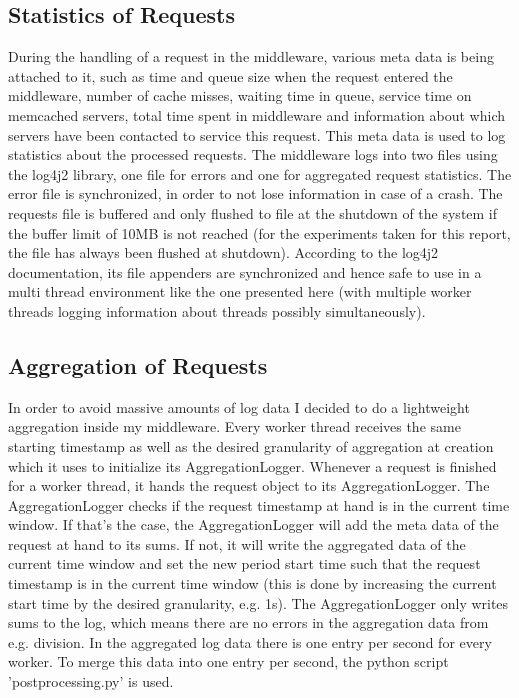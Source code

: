 \documentclass[11pt,a4paper]{article}
\begin{document}
\subsection{Statistics of Requests}
During the handling of a request in the middleware, various meta data is being attached to it, such as time and queue size when the request entered the middleware, number of cache misses, waiting time in queue, service time on memcached servers, total time spent in middleware and information about which servers have been contacted to service this request.
This meta data is used to log statistics about the processed requests.
The middleware logs into two files using the log4j2 library, one file for errors and one for aggregated request statistics.
The error file is synchronized, in order to not lose information in case of a crash.
The requests file is buffered and only flushed to file at the shutdown of the system if the buffer limit of 10MB is not reached (for the experiments taken for this report, the file has always been flushed at shutdown).
According to the log4j2 documentation, its file appenders are synchronized and hence safe to use in a multi thread environment like the one presented here (with multiple worker threads logging information about threads possibly simultaneously).

\subsection{Aggregation of Requests}
In order to avoid massive amounts of log data I decided to do a lightweight aggregation inside my middleware.
Every worker thread receives the same starting timestamp as well as the desired granularity of aggregation at creation which it uses to initialize its AggregationLogger.
Whenever a request is finished for a worker thread, it hands the request object to its AggregationLogger.
The AggregationLogger checks if the request timestamp at hand is in the current time window.
If that's the case, the AggregationLogger will add the meta data of the request at hand to its sums.
If not, it will write the aggregated data of the current time window and set the new period start time such that the request timestamp is in the current time window (this is done by increasing the current start time by the desired granularity, e.g. 1s).
The AggregationLogger only writes sums to the log, which means there are no errors in the aggregation data from e.g. division.
In the aggregated log data there is one entry per second for every worker.
To merge this data into one entry per second, the python script 'postprocessing.py' is used.
\end{document}
